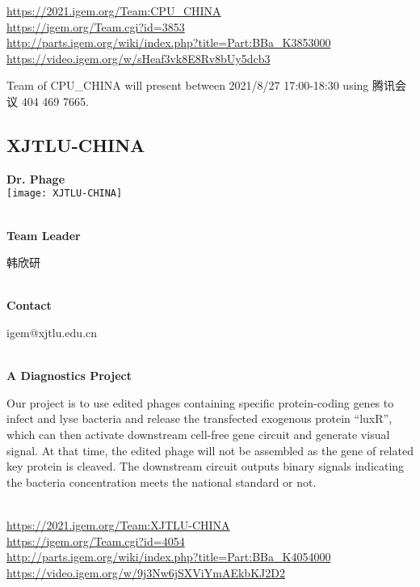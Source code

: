 \url{https://2021.igem.org/Team:CPU\_CHINA }\\
\url{https://igem.org/Team.cgi?id=3853 }\\
\url{http://parts.igem.org/wiki/index.php?title=Part:BBa_K3853000 }\\
\url{https://video.igem.org/w/sHeaf3vk8E8Rv8bUy5dcb3 }\\

\vfill{}









Team of CPU\_CHINA will present between   2021/8/27 17:00-18:30      using 腾讯会议 404 469 7665.
\newpage


\subsection{\textcolor{Blu}{ XJTLU-CHINA } }
\vspace{5mm}
\begin{center}
\large{
  \textbf{ Dr. Phage }\\

  \texttt{[image: XJTLU-CHINA]}
}
\end{center}
\textbf{\\Team Leader}

  韩欣研


\textbf{\\Contact}

  igem@xjtlu.edu.cn


\textbf{\\A Diagnostics Project\\}\begin{spacing}{1.5}

Our project is to use edited phages containing specific protein-coding genes to infect and lyse bacteria and release the transfected exogenous protein “luxR”, which can then activate downstream cell-free gene circuit and generate visual signal. At that time, the edited phage will not be assembled as the gene of related key protein is cleaved. The downstream circuit outputs binary signals indicating the bacteria concentration meets the national standard or not.\end{spacing}
\\

\url{https://2021.igem.org/Team:XJTLU-CHINA }\\
\url{https://igem.org/Team.cgi?id=4054 }\\
\url{http://parts.igem.org/wiki/index.php?title=Part:BBa_K4054000 }\\
\url{https://video.igem.org/w/9j3Nw6jSXViYmAEkbKJ2D2 }\\

